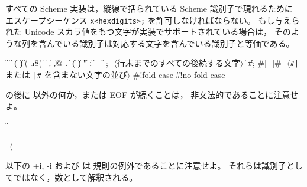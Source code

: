 すべての Scheme 実装は，縦線で括られている Scheme 識別子で現れるために
エスケープシーケンス {\tt \backwhack{}x<hexdigits>;} を許可しなければならない。
もし与えられた Unicode スカラ値をもつ文字が実装でサポートされている場合は，
そのような列を含んでいる識別子は対応する文字を含んでいる識別子と等価である。

\begin{grammar}%
 \:  \|  \| 
\>  \|  \| 
\>  \| ( \| ) \| \sharpsign( \| \sharpsign u8( \| \singlequote{} \| \backquote{} \| , \| ,@ \| {\bf.}
 \:  \| 
\> \| ( \| ) \| " \| ;
 \: 
 \:  \| 
 \: |
 \:  \|  
\> \| 
 \: ; \= $\langle$\rm 行末までのすべての後続する文字$\rangle$
\> \| 
\> \| \#;  
 \: \#| \= 
\>  |\#
 \: \= $\langle$\rm {\tt \#|} または {\tt |\#} を含まない文字の並び$\rangle$
 \:  
 \: \#!fold-case \| \#!no-fold-case%
\end{grammar}

 の後に  以外の何か，または EOF が続くことは，
非文法的であることに注意せよ。

\begin{grammar}%
 \:  \| 
\> \| 
 \: %
\end{grammar}

\label{extendedalphas}
\label{identifiersyntax}

\hbox{\cf{} \goesto{} $\langle$}

以下の {\cf +i}, {\cf -i} および  は
 規則の例外であることに注意せよ。
それらは識別子としてではなく，数として解釈される。

